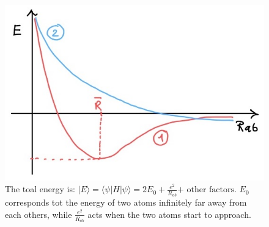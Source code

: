 \begin{figure}[htbp!]
	\centering
	\includegraphics[scale=0.30]{img_9}
	\caption{The toal energy is: $|E \rangle = \langle \psi | H | \psi \rangle = 2E_0 + \frac{e^2}{R_{ab}} \text{+ other factors}$. $E_0$ corresponds tot the energy of two atoms infinitely far away from each others, while $\frac{e^2}{R_{ab}}$ acts when the two atoms start to approach.}
	\label{fig:variational}
\end{figure}
